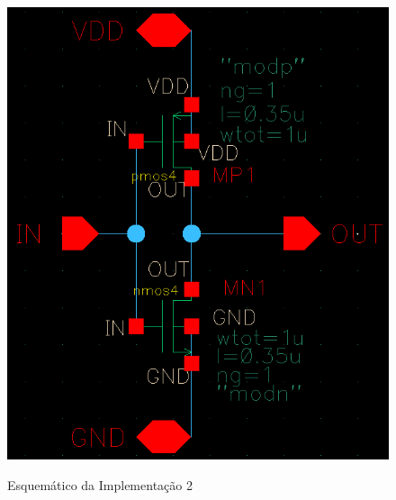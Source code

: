 \documentclass{iiufrgs}
\begin{document}
\begin{figure}[htbp]
    \centering
    \caption{Esquemático da Implementação 2}
    \includegraphics[scale=0.8]{images/esquematico2.png}
    \label{fig:esquematico2}
\end{figure}
\end{document}
